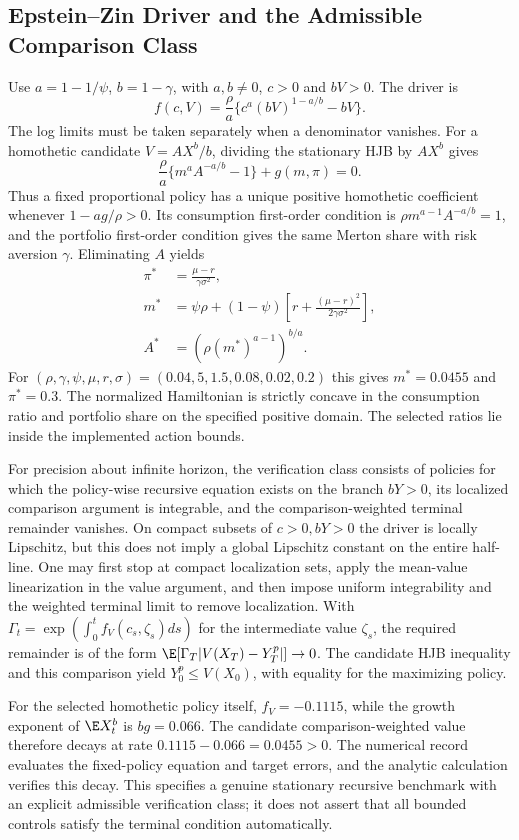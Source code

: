 \subsection{Epstein--Zin Driver and the Admissible Comparison Class}
Use $a=1-1/\psi$, $b=1-\gamma$, with $a,b\ne0$, $c>0$ and $bV>0$. The driver is
\[
 f(c,V)=\frac\rho a\{c^a(bV)^{1-a/b}-bV\}.
\]
The log limits must be taken separately when a denominator vanishes. For a homothetic candidate $V=AX^b/b$, dividing the stationary HJB by $AX^b$ gives
\[
 \frac\rho a\{m^aA^{-a/b}-1\}+g(m,\pi)=0.
\]
Thus a fixed proportional policy has a unique positive homothetic coefficient whenever $1-ag/\rho>0$. Its consumption first-order condition is $\rho m^{a-1}A^{-a/b}=1$, and the portfolio first-order condition gives the same Merton share with risk aversion $\gamma$. Eliminating $A$ yields
\begin{align*}
 \pi^*&=\frac{\mu-r}{\gamma\sigma^2},\\
 m^*&=\psi\rho+(1-\psi)\left[r+\frac{(\mu-r)^2}{2\gamma\sigma^2}\right],\\
 A^*&=(\rho(m^*)^{a-1})^{b/a}.
\end{align*}
For $(\rho,\gamma,\psi,\mu,r,\sigma)=(0.04,5,1.5,0.08,0.02,0.2)$ this gives $m^*=0.0455$ and $\pi^*=0.3$. The normalized Hamiltonian is strictly concave in the consumption ratio and portfolio share on the specified positive domain. The selected ratios lie inside the implemented action bounds.

For precision about infinite horizon, the verification class consists of policies for which the policy-wise recursive equation exists on the branch $bY>0$, its localized comparison argument is integrable, and the comparison-weighted terminal remainder vanishes. On compact subsets of $c>0,bY>0$ the driver is locally Lipschitz, but this does not imply a global Lipschitz constant on the entire half-line. One may first stop at compact localization sets, apply the mean-value linearization in the value argument, and then impose uniform integrability and the weighted terminal limit to remove localization. With $\Gamma_t=\exp(\int_0^t f_V(c_s,\zeta_s)ds)$ for the intermediate value $\zeta_s$, the required remainder is of the form $\E[\Gamma_T|V(X_T)-Y_T^p|]\to0$. The candidate HJB inequality and this comparison yield $Y_0^p\leq V(X_0)$, with equality for the maximizing policy.

For the selected homothetic policy itself, $f_V=-0.1115$, while the growth exponent of $\E X_t^b$ is $bg=0.066$. The candidate comparison-weighted value therefore decays at rate $0.1115-0.066=0.0455>0$. The numerical record evaluates the fixed-policy equation and target errors, and the analytic calculation verifies this decay. This specifies a genuine stationary recursive benchmark with an explicit admissible verification class; it does not assert that all bounded controls satisfy the terminal condition automatically.

